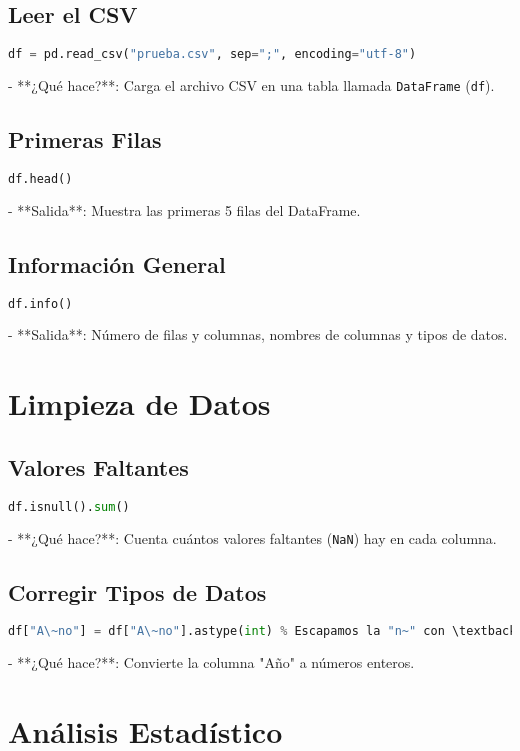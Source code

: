 \documentclass[12pt]{article}
\begin{document}
\subsection{Leer el CSV}
\begin{lstlisting}[language=Python]
df = pd.read_csv("prueba.csv", sep=";", encoding="utf-8")
\end{lstlisting}
- **¿Qué hace?**: Carga el archivo CSV en una tabla llamada \texttt{DataFrame} (\texttt{df}).

\subsection{Primeras Filas}
\begin{lstlisting}[language=Python]
df.head()
\end{lstlisting}
- **Salida**: Muestra las primeras 5 filas del DataFrame.

\subsection{Información General}
\begin{lstlisting}[language=Python]
df.info()
\end{lstlisting}
- **Salida**: Número de filas y columnas, nombres de columnas y tipos de datos.

\section{Limpieza de Datos}
\subsection{Valores Faltantes}
\begin{lstlisting}[language=Python]
df.isnull().sum()
\end{lstlisting}
- **¿Qué hace?**: Cuenta cuántos valores faltantes (\texttt{NaN}) hay en cada columna.

\subsection{Corregir Tipos de Datos}
\begin{lstlisting}[language=Python]
df["A\~no"] = df["A\~no"].astype(int) % Escapamos la "n~" con \textbackslash{}~n
\end{lstlisting}
- **¿Qué hace?**: Convierte la columna "Año" a números enteros.

\section{Análisis Estadístico}
\end{document}
